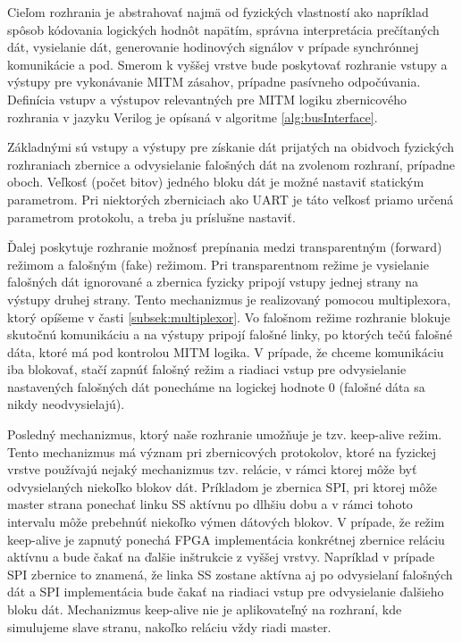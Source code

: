 Cieľom rozhrania je abstrahovať najmä od fyzických vlastností ako napríklad spôsob kódovania logických hodnôt napätím, správna interpretácia prečítaných dát, vysielanie dát, generovanie hodinových signálov v prípade synchrónnej komunikácie a pod. Smerom k vyššej vrstve bude poskytovať rozhranie vstupy a výstupy pre vykonávanie MITM zásahov, prípadne pasívneho odpočúvania. Definícia vstupv a výstupov relevantných pre MITM logiku zbernicového rozhrania v jazyku Verilog je opísaná v algoritme \ref{alg:busInterface}.

Základnými sú vstupy a výstupy pre získanie dát prijatých na obidvoch fyzických rozhraniach zbernice a odvysielanie falošných dát na zvolenom rozhraní, prípadne oboch. Veľkosť (počet bitov) jedného bloku dát je možné nastaviť statickým parametrom. Pri niektorých zberniciach ako UART je táto veľkosť priamo určená parametrom protokolu, a treba ju príslušne nastaviť.

Ďalej poskytuje rozhranie možnosť prepínania medzi transparentným (forward) režimom a falošným (fake) režimom. Pri transparentnom režime je vysielanie falošných dát ignorované a zbernica fyzicky pripojí vstupy jednej strany na výstupy druhej strany. Tento mechanizmus je realizovaný pomocou multiplexora, ktorý opíšeme v časti \ref{subsek:multiplexor}. Vo falošnom režime rozhranie blokuje skutočnú komunikáciu a na výstupy pripojí falošné linky, po ktorých tečú falošné dáta, ktoré má pod kontrolou MITM logika. V prípade, že chceme komunikáciu iba blokovať, stačí zapnúť falošný režim a riadiaci vstup pre odvysielanie nastavených falošných dát ponecháme na logickej hodnote 0 (falošné dáta sa nikdy neodvysielajú).

Posledný mechanizmus, ktorý naše rozhranie umožňuje je tzv. keep-alive režim. Tento mechanizmus má význam pri zbernicových protokolov, ktoré na fyzickej vrstve používajú nejaký mechanizmus tzv. relácie, v rámci ktorej môže byť odvysielaných niekoľko blokov dát. Príkladom je zbernica SPI, pri ktorej môže master strana ponechať linku SS aktívnu po dlhšiu dobu a v rámci tohoto intervalu môže prebehnúť niekoľko výmen dátových blokov. V prípade, že režim keep-alive je zapnutý ponechá FPGA implementácia konkrétnej zbernice reláciu aktívnu a bude čakať na ďalšie inštrukcie z vyššej vrstvy. Napríklad v prípade SPI zbernice to znamená, že linka SS zostane aktívna aj po odvysielaní falošných dát a SPI implementácia bude čakať na riadiaci vstup pre odvysielanie ďalšieho bloku dát. Mechanizmus keep-alive nie je aplikovateľný na rozhraní, kde simulujeme slave stranu, nakoľko reláciu vždy riadi master.

